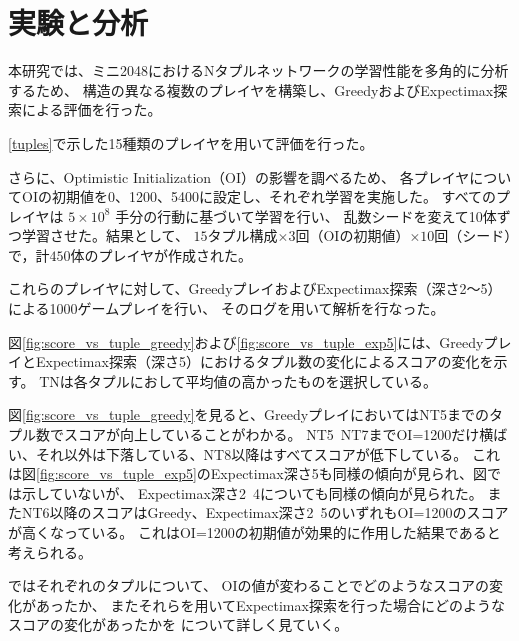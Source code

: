 \section{実験と分析}

本研究では、ミニ2048におけるNタプルネットワークの学習性能を多角的に分析するため、
構造の異なる複数のプレイヤを構築し、GreedyおよびExpectimax探索による評価を行った。

\ref{tuples}で示した15種類のプレイヤを用いて評価を行った。

さらに、Optimistic Initialization（OI）の影響を調べるため、
各プレイヤについてOIの初期値を0、1200、5400に設定し、それぞれ学習を実施した。
すべてのプレイヤは $5 \times 10^8$ 手分の行動に基づいて学習を行い、
乱数シードを変えて10体ずつ学習させた。結果として、
$15$タプル構成$\times 3$回（OIの初期値）$\times 10$回（シード）で，計$450$体のプレイヤが作成された。

これらのプレイヤに対して、GreedyプレイおよびExpectimax探索（深さ2〜5）による1000ゲームプレイを行い、
そのログを用いて解析を行なった。

図\ref{fig:score_vs_tuple_greedy}および\ref{fig:score_vs_tuple_exp5}には、GreedyプレイとExpectimax探索（深さ5）におけるタプル数の変化によるスコアの変化を示す。
TNは各タプルにおして平均値の高かったものを選択している。

図\ref{fig:score_vs_tuple_greedy}を見ると、GreedyプレイにおいてはNT5までのタプル数でスコアが向上していることがわかる。
NT5~NT7までOI=1200だけ横ばい、それ以外は下落している、NT8以降はすべてスコアが低下している。
これは図\ref{fig:score_vs_tuple_exp5}のExpectimax深さ5も同様の傾向が見られ、図では示していないが、
Expectimax深さ2~4についても同様の傾向が見られた。
またNT6以降のスコアはGreedy、Expectimax深さ2~5のいずれもOI=1200のスコアが高くなっている。
これはOI=1200の初期値が効果的に作用した結果であると考えられる。

ではそれぞれのタプルについて、
OIの値が変わることでどのようなスコアの変化があったか、
またそれらを用いてExpectimax探索を行った場合にどのようなスコアの変化があったかを
について詳しく見ていく。

